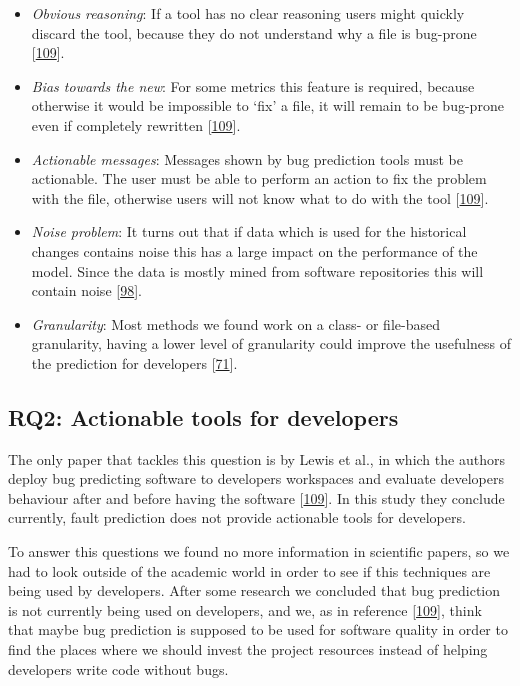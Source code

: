 \documentclass[]{book}
\providecommand{\tightlist}{%
  \setlength{\itemsep}{0pt}\setlength{\parskip}{0pt}}
\begin{document}
\begin{itemize}
\tightlist
\item
  \emph{Obvious reasoning}: If a tool has no clear reasoning users might
  quickly discard the tool, because they do not understand why a file is
  bug-prone {[}\protect\hyperlink{ref-Lewis2013}{109}{]}.
\item
  \emph{Bias towards the new}: For some metrics this feature is
  required, because otherwise it would be impossible to `fix' a file, it
  will remain to be bug-prone even if completely rewritten
  {[}\protect\hyperlink{ref-Lewis2013}{109}{]}.
\item
  \emph{Actionable messages}: Messages shown by bug prediction tools
  must be actionable. The user must be able to perform an action to fix
  the problem with the file, otherwise users will not know what to do
  with the tool {[}\protect\hyperlink{ref-Lewis2013}{109}{]}.
\item
  \emph{Noise problem}: It turns out that if data which is used for the
  historical changes contains noise this has a large impact on the
  performance of the model. Since the data is mostly mined from software
  repositories this will contain noise
  {[}\protect\hyperlink{ref-Kim2011}{98}{]}.
\item
  \emph{Granularity}: Most methods we found work on a class- or
  file-based granularity, having a lower level of granularity could
  improve the usefulness of the prediction for developers
  {[}\protect\hyperlink{ref-giger2012}{71}{]}.
\end{itemize}

\subsection{RQ2: Actionable tools for
developers}\label{rq2-actionable-tools-for-developers}

The only paper that tackles this question is by Lewis et al., in which
the authors deploy bug predicting software to developers workspaces and
evaluate developers behaviour after and before having the software
{[}\protect\hyperlink{ref-Lewis2013}{109}{]}. In this study they
conclude currently, fault prediction does not provide actionable tools
for developers.

To answer this questions we found no more information in scientific
papers, so we had to look outside of the academic world in order to see
if this techniques are being used by developers. After some research we
concluded that bug prediction is not currently being used on developers,
and we, as in reference {[}\protect\hyperlink{ref-Lewis2013}{109}{]},
think that maybe bug prediction is supposed to be used for software
quality in order to find the places where we should invest the project
resources instead of helping developers write code without bugs.
\end{document}
